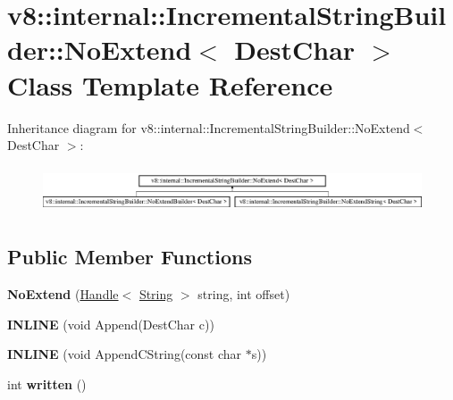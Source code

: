 \hypertarget{classv8_1_1internal_1_1_incremental_string_builder_1_1_no_extend}{}\section{v8\+:\+:internal\+:\+:Incremental\+String\+Builder\+:\+:No\+Extend$<$ Dest\+Char $>$ Class Template Reference}
\label{classv8_1_1internal_1_1_incremental_string_builder_1_1_no_extend}
Inheritance diagram for v8\+:\+:internal\+:\+:Incremental\+String\+Builder\+:\+:No\+Extend$<$ Dest\+Char $>$\+:\begin{figure}[H]
\begin{center}
\leavevmode
\includegraphics[height=1.389578cm]{classv8_1_1internal_1_1_incremental_string_builder_1_1_no_extend}
\end{center}
\end{figure}
\subsection*{Public Member Functions}
\begin{DoxyCompactItemize}
\item 
{\bfseries No\+Extend} (\hyperlink{classv8_1_1internal_1_1_handle}{Handle}$<$ \hyperlink{classv8_1_1internal_1_1_string}{String} $>$ string, int offset)\hypertarget{classv8_1_1internal_1_1_incremental_string_builder_1_1_no_extend_af7299e1f5cebc06d90ab676b6b4a5f12}{}\label{classv8_1_1internal_1_1_incremental_string_builder_1_1_no_extend_af7299e1f5cebc06d90ab676b6b4a5f12}

\item 
{\bfseries I\+N\+L\+I\+NE} (void Append(Dest\+Char c))\hypertarget{classv8_1_1internal_1_1_incremental_string_builder_1_1_no_extend_a7bd0905d2aae5f253e80a7550f9e784f}{}\label{classv8_1_1internal_1_1_incremental_string_builder_1_1_no_extend_a7bd0905d2aae5f253e80a7550f9e784f}

\item 
{\bfseries I\+N\+L\+I\+NE} (void Append\+C\+String(const char $\ast$s))\hypertarget{classv8_1_1internal_1_1_incremental_string_builder_1_1_no_extend_aba769e0cef00df0fcdcbfd3f7526ffa2}{}\label{classv8_1_1internal_1_1_incremental_string_builder_1_1_no_extend_aba769e0cef00df0fcdcbfd3f7526ffa2}

\item 
int {\bfseries written} ()\hypertarget{classv8_1_1internal_1_1_incremental_string_builder_1_1_no_extend_a4e79d84dd6c70ad7eba3e3faa2f2d3e6}{}\label{classv8_1_1internal_1_1_incremental_string_builder_1_1_no_extend_a4e79d84dd6c70ad7eba3e3faa2f2d3e6}

\end{DoxyCompactItemize}
